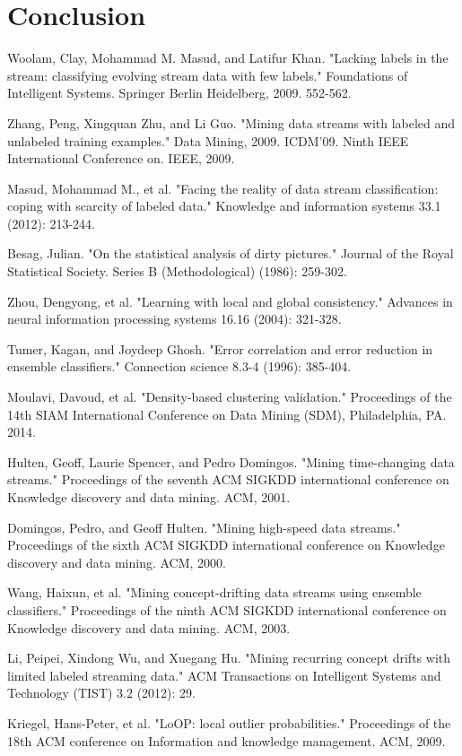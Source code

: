 \documentclass[12pt,a4paper,oneside]{report}
\begin{document}
\section{Conclusion}
\begin{thebibliography}{20}

Woolam, Clay, Mohammad M. Masud, and Latifur Khan. "Lacking labels in the stream: classifying evolving stream data with few labels." Foundations of Intelligent Systems. Springer Berlin Heidelberg, 2009. 552-562.

Zhang, Peng, Xingquan Zhu, and Li Guo. "Mining data streams with labeled and unlabeled training examples." Data Mining, 2009. ICDM'09. Ninth IEEE International Conference on. IEEE, 2009.

Masud, Mohammad M., et al. "Facing the reality of data stream classification: coping with scarcity of labeled data." Knowledge and information systems 33.1 (2012): 213-244.

Besag, Julian. "On the statistical analysis of dirty pictures." Journal of the Royal Statistical Society. Series B (Methodological) (1986): 259-302.

Zhou, Dengyong, et al. "Learning with local and global consistency." Advances in neural information processing systems 16.16 (2004): 321-328.

Tumer, Kagan, and Joydeep Ghosh. "Error correlation and error reduction in ensemble classifiers." Connection science 8.3-4 (1996): 385-404.

Moulavi, Davoud, et al. "Density-based clustering validation." Proceedings of the 14th SIAM International Conference on Data Mining (SDM), Philadelphia, PA. 2014.

Hulten, Geoff, Laurie Spencer, and Pedro Domingos. "Mining time-changing data streams." Proceedings of the seventh ACM SIGKDD international conference on Knowledge discovery and data mining. ACM, 2001.

Domingos, Pedro, and Geoff Hulten. "Mining high-speed data streams." Proceedings of the sixth ACM SIGKDD international conference on Knowledge discovery and data mining. ACM, 2000.

Wang, Haixun, et al. "Mining concept-drifting data streams using ensemble classifiers." Proceedings of the ninth ACM SIGKDD international conference on Knowledge discovery and data mining. ACM, 2003.

Li, Peipei, Xindong Wu, and Xuegang Hu. "Mining recurring concept drifts with limited labeled streaming data." ACM Transactions on Intelligent Systems and Technology (TIST) 3.2 (2012): 29.

Kriegel, Hans-Peter, et al. "LoOP: local outlier probabilities." Proceedings of the 18th ACM conference on Information and knowledge management. ACM, 2009.

\end{thebibliography}
\end{document}
